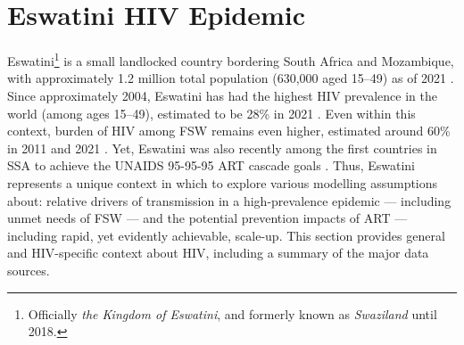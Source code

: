 \section{Eswatini HIV Epidemic}\label{intro.esw} %
Eswatini\footnote{Officially \emph{the Kingdom of Eswatini},
  and formerly known as \emph{Swaziland} until 2018.}
is a small landlocked country bordering South Africa and Mozambique,
with approximately 1.2 million total population (630,000 aged 15--49) as of 2021 \cite{DataBank}.
Since approximately 2004, Eswatini has had
the highest HIV prevalence in the world (among ages 15--49),
estimated to be 28\% in 2021 \cite{DataBank,AIDSinfo}.
Even within this context, burden of HIV among FSW remains even higher,
estimated around 60\% in 2011 and 2021 \cite{Baral2014,EswIBBS2022}.
Yet, Eswatini was also recently among the first countries in SSA
to achieve the UNAIDS 95-95-95 ART cascade goals \cite{959595,AIDSinfo}.
Thus, Eswatini represents a unique context in which to explore
various modelling assumptions about:
relative drivers of transmission in a high-prevalence epidemic --- including unmet needs of FSW ---
and the potential prevention impacts of ART --- including rapid, yet evidently achievable, scale-up.
This section provides general and HIV-specific context about HIV,
including a summary of the major data sources.
